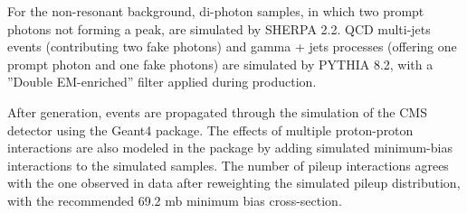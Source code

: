 For the non-resonant background, di-photon samples, in which two prompt photons not forming a peak, are simulated by SHERPA 2.2. QCD multi-jets events (contributing two fake photons) and gamma + jets processes (offering one prompt photon and one fake photons) are simulated by PYTHIA 8.2, with a ”Double EM-enriched” filter applied during production. 


After generation, events are propagated through the simulation of the CMS detector using the
Geant4\cite{AGOSTINELLI2003250} package. The effects of multiple proton-proton interactions are also modeled in the package by adding simulated minimum-bias interactions to the simulated samples. The number of pileup interactions agrees with the one observed in data after reweighting the simulated pileup distribution, with the recommended 69.2 mb minimum bias cross-section.


\begin{table}[H]
    \centering
    \caption{List of Monte Carlo signal samples used in the analysis with their cross-section\cite{CrossSection_1}.} 
    \label{tab:my_labeL_Signal}
\end{table}



